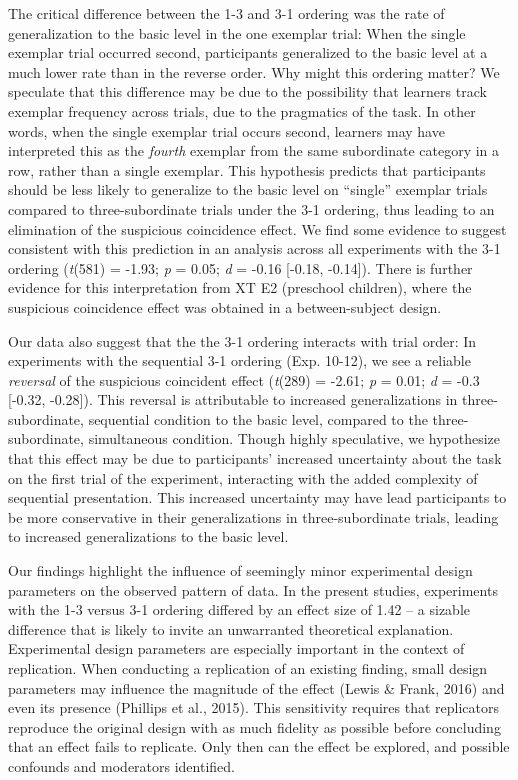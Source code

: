 \documentclass[english,floatsintext,man]{apa6}
\theoremstyle{definition}
\theoremstyle{definition}
\theoremstyle{definition}
\theoremstyle{remark}
\begin{document}
The critical difference between the 1-3 and 3-1 ordering was the rate of
generalization to the basic level in the one exemplar trial: When the
single exemplar trial occurred second, participants generalized to the
basic level at a much lower rate than in the reverse order. Why might
this ordering matter? We speculate that this difference may be due to
the possibility that learners track exemplar frequency across trials,
due to the pragmatics of the task. In other words, when the single
exemplar trial occurs second, learners may have interpreted this as the
\emph{fourth} exemplar from the same subordinate category in a row,
rather than a single exemplar. This hypothesis predicts that
participants should be less likely to generalize to the basic level on
\enquote{single} exemplar trials compared to three-subordinate trials
under the 3-1 ordering, thus leading to an elimination of the suspicious
coincidence effect. We find some evidence to suggest consistent with
this prediction in an analysis across all experiments with the 3-1
ordering (\emph{t}(581) = -1.93; \emph{p} = 0.05; \emph{d} = -0.16
{[}-0.18, -0.14{]}). There is further evidence for this interpretation
from XT E2 (preschool children), where the suspicious coincidence effect
was obtained in a between-subject design.

Our data also suggest that the the 3-1 ordering interacts with trial
order: In experiments with the sequential 3-1 ordering (Exp. 10-12), we
see a reliable \emph{reversal} of the suspicious coincident effect
(\emph{t}(289) = -2.61; \emph{p} = 0.01; \emph{d} = -0.3 {[}-0.32,
-0.28{]}). This reversal is attributable to increased generalizations in
three-subordinate, sequential condition to the basic level, compared to
the three-subordinate, simultaneous condition. Though highly
speculative, we hypothesize that this effect may be due to participants'
increased uncertainty about the task on the first trial of the
experiment, interacting with the added complexity of sequential
presentation. This increased uncertainty may have lead participants to
be more conservative in their generalizations in three-subordinate
trials, leading to increased generalizations to the basic level.

Our findings highlight the influence of seemingly minor experimental
design parameters on the observed pattern of data. In the present
studies, experiments with the 1-3 versus 3-1 ordering differed by an
effect size of 1.42 -- a sizable difference that is likely to invite an
unwarranted theoretical explanation. Experimental design parameters are
especially important in the context of replication. When conducting a
replication of an existing finding, small design parameters may
influence the magnitude of the effect (Lewis \& Frank, 2016) and even
its presence (Phillips et al., 2015). This sensitivity requires that
replicators reproduce the original design with as much fidelity as
possible before concluding that an effect fails to replicate. Only then
can the effect be explored, and possible confounds and moderators
identified.
\end{document}
